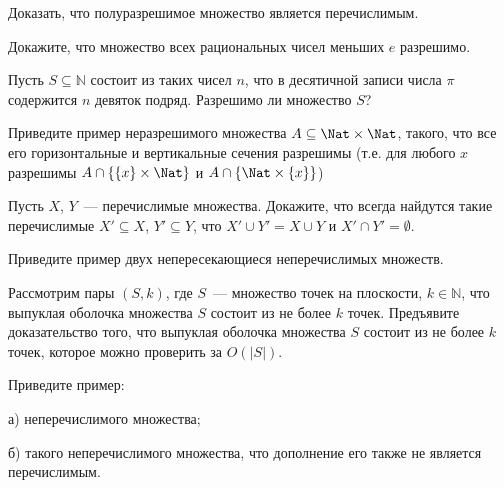 \setcounter{curtask}{6}


\begin{task}
    Доказать, что полуразрешимое множество является перечислимым.
\end{task}

\begin{task}
    Докажите, что множество всех рациональных чисел меньших $e$ разрешимо.
\end{task}

\begin{task}
    Пусть $S \subseteq \mathbb{N}$ состоит из таких чисел $n$, что в десятичной
    записи числа $\pi$ содержится $n$ девяток подряд. Разрешимо ли множество $S$?
\end{task}

\begin{task}
    Приведите пример неразрешимого множества $A \subseteq \Nat \times \Nat$,
    такого, что все его горизонтальные и вертикальные сечения
    разрешимы (т.е. для любого $x$ разрешимы $A \cap \{\{x\} \times \Nat\}$
    и $A \cap \{\Nat \times \{x\}\}$)
\end{task}

\begin{task}
    Пусть $X$, $Y$~--- перечислимые множества. Докажите, что всегда
    найдутся такие перечислимые $X' \subseteq X$, $Y' \subseteq Y$,
    что $X' \cup Y' = X \cup Y$ и $X' \cap Y' = \emptyset$.
\end{task}

\begin{task}
    Приведите пример двух непересекающиеся неперечислимых множеств.
\end{task}

\begin{task}
    Рассмотрим пары $(S, k)$, где $S$~--- множество точек на плоскости, $k
    \in \mathbb{N}$, что выпуклая оболочка множества $S$ состоит из не более $k$
    точек. Предъявите доказательство того, что выпуклая оболочка множества $S$
    состоит из не более $k$ точек, которое можно проверить за $O(|S|)$.
\end{task}

\breakline

\begin{ptask}{5}
    Приведите пример:
    
    а) неперечислимого множества;

    б) такого неперечислимого множества, что дополнение его также не является
    перечислимым.
\end{ptask}